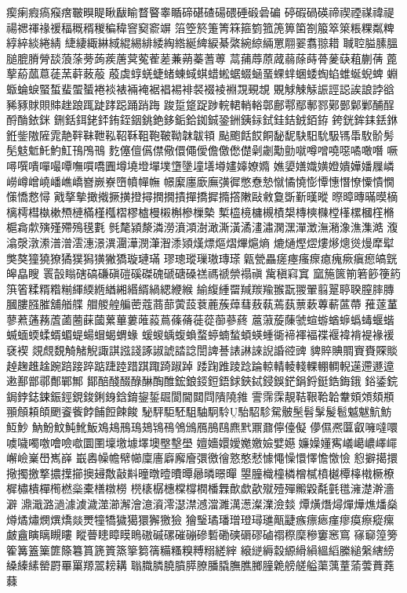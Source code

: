 瘈瘌瘕瘑瘊瘔皸瞁睼瞅瞂睮瞀睯睾瞃碲碪碴碭碨硾碫碞碥
碠碬碢碤禘禊禋禖禕禔禓禗禈禒禐稫穊稰稯稨稦窨窫窬竮
箈箜箊箑箐箖箍箌箛箎箅箘劄箙箤箂粻粿粼粺綧綷緂綣綪
緁緀緅綝緎緄緆緋緌綯綹綖綼綟綦綮綩綡緉罳翢翣翥翞耤
聝聜膉膆膃膇膍膌膋舕蒗蒤蒡蒟蒺蓎蓂蒬蒮蒫蒹蒴蓁蓍蒪
蒚蒱蓐蒝蒧蒻蒢蒔蓇蓌蒛蒩蒯蒨蓖蒘蒶蓏蒠蓗蓔蓒蓛蒰
蒑虡蜳蜣蜨蝫蝀蜮蜞蜡蜙蜛蝃蜬蝁蜾蝆蜠蜲蜪蜭蜼蜒蜺蜱
蜵蝂蜦蜧蜸蜤蜚蜰蜑裷裧裱裲裺裾裮裼裶裻裰裬裫覝覡覟
覞觩觫觨誫誙誋誒誏誖谽豨豩賕賏賗趖踉踂跿踍跽踊踃踇
踆踅跾踀踄輐輑輎輍鄣鄜鄠鄢鄟鄝鄚鄤鄡鄛酺酲酹酳銥銤
鉶銛鉺銠銔銪銍銦銚銫鉹銗鉿銣鋮銎銂銕銢鉽銈銡銊銆銌
銙銧鉾銇銩銝銋鈭隞隡雿靘靽靺靾鞃鞀鞂靻鞄鞁靿韎韍頖
颭颮餂餀餇馝馜駃馹馻馺駂馽駇骱髣髧鬾鬿魠魡魟鳱鳲鳵
麧僿儃儰僸儆儇僶僾儋儌僽儊劋劌勱勯噈噂噌嘵噁噊噉噆
噘噚噀嘳嘽嘬嘾嘸嘪嘺圚墫墝墱墠墣墯墬墥墡壿嫿嫴嫽嫷
嫶嬃嫸嬂嫹嬁嬇嬅嬏屧嶙嶗嶟嶒嶢嶓嶕嶠嶜嶡嶚嶞幩幝幠
幜緳廛廞廡彉徲憋憃慹憱憰憢憉憛憓憯憭憟憒憪憡憍慦憳
戭摮摰撖撠撅撗撜撏撋撊撌撣撟摨撱撘敶敺敹敻斲斳暵暰
暩暲暷暪暯樀樆樗槥槸樕槱槤樠槿槬槢樛樝槾樧槲槮樔槷
槧橀樈槦槻樍槼槫樉樄樘樥樏槶樦樇槴樖歑殥殣殢殦氁氀
毿氂潁漦潾澇濆澒澍澉澌潢潏澅潚澖潶潬澂潕潲潒潐潗澔
澓潝漀潡潫潽潧澐潓澋潩潿澕潣潷潪潻熲熯熛熰熠熚熩熵
熝熥熞熤熡熪熜熧熳犘犚獘獒獞獟獠獝獛獡獚獙獢璇璉璊
璆璁瑽璅璈瑼瑹甈甇畾瘥瘞瘙瘝瘜瘣瘚瘨瘛皜皝皞皛瞍
瞏瞉瞈磍碻磏磌磑磎磔磈磃磄磉禚禡禠禜禢禛歶稹窲窴
窳箷篋箾箬篎箯箹篊箵糅糈糌糋緷緛緪緧緗緡縃緺緦緶緱
緰緮緟罶羬羰羭翭翫翪翬翦翨聤聧膣膟膞膕膢膙膗舖艏艓
艒艐艎艑蔤蔻蔏蔀蔩蔎蔉蔍蔟蔊蔧蔜蓻蔫蓺蔈蔌蓴蔪蓲蔕
蓷蓫蓳蓼蔒蓪蓩蔖蓾蔨蔝蔮蔂蓽蔞蓶蔱蔦蓧蓨蓰蓯蓹蔘蔠
蔰蔋蔙蔯虢蝖蝣蝤蝷蟡蝳蝘蝔蝛蝒蝡蝚蝑蝞蝭蝪蝐蝎蝟蝝
蝯蝬蝺蝮蝜蝥蝏蝻蝵蝢蝧蝩衚褅褌褔褋褗褘褙褆褖褑褎褉
覢覤覣觭觰觬諏諆誸諓諑諔諕誻諗誾諀諅諘諃誺誽諙谾豍
貏賥賟賙賨賚賝賧趠趜趡趛踠踣踥踤踮踕踛踖踑踙踦踧踔
踒踘踓踜踗踚輬輤輘輚輠輣輖輗遳遰遯遧遫鄯鄫鄩鄪鄲鄦
鄮醅醆醊醁醂醄醀鋐鋃鋄鋀鋙銶鋏鋱鋟鋘鋩鋗鋝鋌鋯鋂鋨
鋊鋈鋎鋦鋍鋕鋉鋠鋞鋧鋑鋓銵鋡錥鋆銴镼閬閫閮閰隤隢雓
霅霈霂靚鞊鞎鞈韐韏頞頝頦頩頨頠頛頧颲餈飺餑餔餖餗餕
駜駍駏駓駔駎駉駖駘駋駗駌骳髬髫髳髲髱魆魃魧魴魱魦
魶魵魰魨魤魬鳼鳺鳽鳿鳷鴇鴀鳹鳻鴈鴅鴄麃黓鼏鼐儜儓儗
儚儑凞匴叡噰噠噮噳噦噣噭噲噞噷圜圛壈墽壉墿墺壂墼壆
嬗嬙嬛嬡嬔嬓嬐嬖嬨嬚嬠嬞寯嶬嶱嶩嶧嶵嶰嶮嶪嶨嶲嶭
嶯嶴幧幨幦幯廩廧廦廨廥彋徼徻憝憨憖懅憴懆懁懌憺憿憸
憌擗擖擐擏擉撽撉擃擛擳擙攳敿敼斢曈暾曀曊曋曏暽暻暺
曌朣樴橦橉橧樲橨樾橝橭橶橛橑樨橚樻樿橁橪橤橐橏橔橯
橩橠樼橞橖橕橍橎橆歕歔歖殧殪殫毈毇氄氃氆澭濋澣濇澼
濎濈潞濄澽澞濊澨瀄澥澮澺澬澪濏澿澸澢濉澫濍澯澲澰燅
燂熿熸燖燀燁燋燔燊燇燏熽燘熼燆燚燛犝犞獩獦獧獬獥獫
獪瑿璚璠璔璒璕璡甋疀瘯瘭瘱瘽瘳瘼瘵瘲瘰皻盦瞚瞝瞡瞜
瞛瞢瞣瞕瞙瞗磝磩磥磪磞磣磛磡磢磭磟磠禤穄穈穇窶窸窵
窱窷篞篣篧篝篕篥篚篨篹篔篪篢篜篫篘篟糒糔糗糐糑縒縡
縗縌縟縠縓縎縜縕縚縢縋縏縖縍縔縥縤罃罻罼罺羱翯耪耩
聬膱膦膮膹膵膫膰膬膴膲膷膧臲艕艖艗蕖蕅蕫蕍蕓蕡蕘蕀
